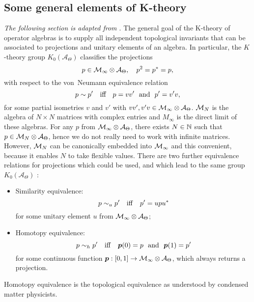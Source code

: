 \documentclass[
    aps,
    prb,
    twocolumn,
    floatfix,
    superscriptaddress,
	10pt
]{revtex4-2}
\begin{document}
\subsection{Some general elements of K-theory}

{\it The following section is adapted from \cite{Liu2022}}. The general goal of the K-theory of operator algebras is to supply all independent topological invariants that can be associated to projections and unitary elements of an algebra.
In particular, the $K$-theory group $K_0(\mathcal{A}_\Theta)$ classifies the projections
\begin{equation}
p \in {\mathcal M}_\infty \otimes {\mathcal A}_\Theta, \quad p^2 = p^\ast=p,
\end{equation}
with respect to the von~Neumann equivalence relation
\begin{equation}\label{Eq-EquivRelation}
p \sim p' \quad \mbox{iff}  \quad p=vv' \ \  {\rm and} \ \ p' = v'v, 
\end{equation}
for some partial isometries $v$ and $v'$ with  $ vv', v'v \in {\mathcal M}_\infty \otimes {\mathcal A}_\Theta$. 
${\mathcal M}_N$ is the algebra of $N \times N$ matrices with complex entries and $M_\infty$ is the direct limit of these algebras. 
For any $p$ from ${\mathcal M}_\infty \otimes {\mathcal A}_\Theta$, there exists $N \in {\mathbb N}$ such that $p \in {\mathcal M}_N \otimes {\mathcal A}_\Theta$, hence we do not really need to work with infinite matrices. However, ${\mathcal M}_N$ can be canonically embedded into ${\mathcal M}_\infty$ and this convenient, because it enables $N$ to take flexible values.
There are two further equivalence relations for projections which could be used, and which lead to the same group $K_0(\mathcal{A}_\Theta)$ \cite[p.~18]{Park2008}:
\begin{itemize}
\item  Similarity equivalence:
\begin{equation}
p \sim_u p' \quad {\rm iff} \quad p'= u p u^\ast
\end{equation}
for some unitary element $u$ from ${\mathcal M}_\infty \otimes {\mathcal A}_\Theta$;
\item Homotopy equivalence:
\begin{equation}
p \sim_h p' \quad  {\rm iff} \quad \bm p(0)=p \ \  {\rm and} \ \  \bm p(1) = p'
\end{equation}
for some continuous function $\bm p : [0,1] \rightarrow {\mathcal M}_\infty \otimes {\mathcal A}_\Theta$, which always returns a projection. 
\end{itemize}
Homotopy equivalence is the topological equivalence as understood by condensed matter physicists. 
\end{document}
